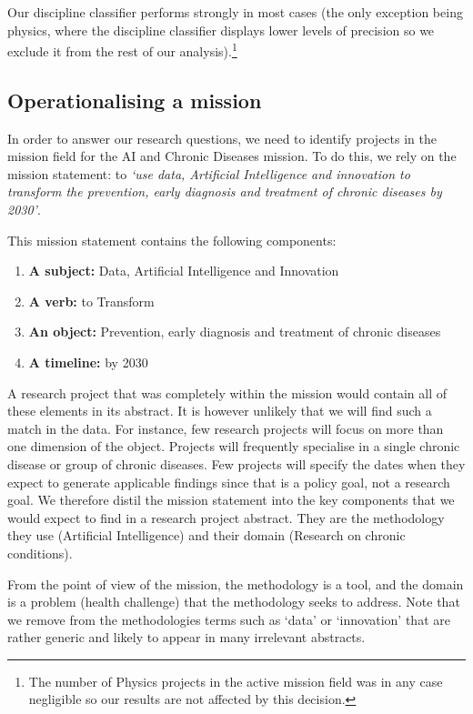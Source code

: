 \documentclass[11pt]{article}
\begin{document}
Our discipline classifier performs strongly in most cases (the only exception being physics, where the discipline classifier displays lower levels of precision so we exclude it from the rest of our analysis).\footnote{The number of Physics projects in the active mission field was in any case negligible so our results are not affected by this decision.}

\subsection{Operationalising a mission}
In order to answer our research questions, we need to identify projects in the mission field for the AI and Chronic Diseases mission. To do this, we rely on the mission statement: to \textit{`use data, Artificial Intelligence and innovation to transform the prevention, early diagnosis and treatment of chronic diseases by 2030'}. 

This mission statement contains the following components:

\begin{enumerate}
    \item \textbf{A subject:} Data, Artificial Intelligence and Innovation
    \item \textbf{A verb:} to Transform
    \item \textbf{An object:} Prevention, early diagnosis and treatment of chronic diseases
    \item \textbf{A timeline:} by 2030
\end{enumerate}

A research project that was completely within the mission would contain all of these elements in its abstract. It is however unlikely that we will find such a match in the data. For instance, few research projects will focus on more than one dimension of the object. Projects will frequently specialise in a single chronic disease or group of chronic diseases. Few projects will specify the dates when they expect to generate applicable findings since that is a policy goal, not a research goal.  We therefore distil the mission statement into the key components that we would expect to find in a research project abstract. They are the methodology they use (Artificial Intelligence) and their domain (Research on chronic conditions). 

From the point of view of the mission, the methodology is a tool, and the domain is a problem (health challenge) that the methodology seeks to address. Note that we remove from the methodologies terms such as ‘data’ or ‘innovation’ that are rather generic and likely to appear in many irrelevant abstracts. 
\end{document}
